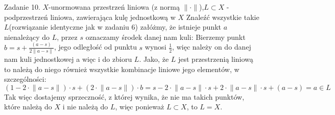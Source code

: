 \documentclass{article}
\begin{document}
Zadanie 10.
\newline
\newline
$X$-unormowana przestrzeń liniowa (z normą $\lVert\cdot\rVert$),\newline $L\subset X$ - podprzestrzeń liniowa, zawierająca kulę jednostkową w $X$\newline
Znaleźć wszystkie takie $L$(rozwiązanie identyczne jak w zadaniu 6)\newline
załóżmy, że istnieje punkt $a$ nienależący do $L$, przez $s$ oznaczamy środek danej nam kuli:\newline
Bierzemy punkt $b=s+\frac{(a-s)}{2\lVert a-s\rVert}$, jego odległość od  punktu $s$ wynosi $\frac{1}{2}$, więc należy on do danej nam kuli jednostkowej
a więc i do zbioru $L$.\newline
Jako, że $L$ jest przestrzenią liniową to należą do niego również wszystkie kombinacje liniowe jego elementów, w szczególności:\newline
$\left(1-2\cdot\lVert a-s\rVert\right)\cdot s+\left(2\cdot\lVert a-s\rVert\right)\cdot b=
s-2\cdot\lVert a-s\rVert\cdot s+2\cdot\lVert a-s\rVert\cdot s+(a-s)=a\in L$\newline
Tak więc dostajemy sprzeczność, z której wynika, że nie ma takich punktów, które należą do $X$ i nie należą do $L$, więc ponieważ $L\subset X$, to $L=X$.\newpage
\end{document}
